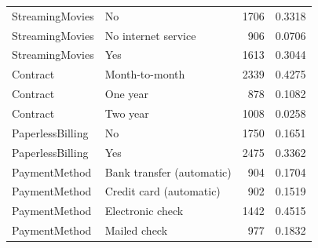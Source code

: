 \begin{tabular}{llrr}
StreamingMovies & No & 1706 & 0.3318 \\
StreamingMovies & No internet service & 906 & 0.0706 \\
StreamingMovies & Yes & 1613 & 0.3044 \\
Contract & Month-to-month & 2339 & 0.4275 \\
Contract & One year & 878 & 0.1082 \\
Contract & Two year & 1008 & 0.0258 \\
PaperlessBilling & No & 1750 & 0.1651 \\
PaperlessBilling & Yes & 2475 & 0.3362 \\
PaymentMethod & Bank transfer (automatic) & 904 & 0.1704 \\
PaymentMethod & Credit card (automatic) & 902 & 0.1519 \\
PaymentMethod & Electronic check & 1442 & 0.4515 \\
PaymentMethod & Mailed check & 977 & 0.1832 \\
\bottomrule
\end{tabular}
